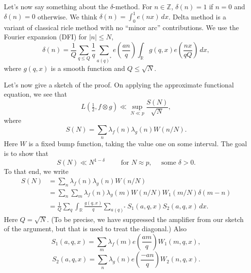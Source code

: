 \documentclass[reqno]{amsart} 
\begin{document}
Let's now say something about the $\delta$-method.  For $n \in \mathbb{Z}$, $\delta(n) = 1$ if $n = 0$ and $\delta(n) = 0$ otherwise.  We think $\delta(n) = \int_0^1 e(n x) \, d x$.  Delta method is a variant of classical ricle method with no ``minor arc'' contributions.  We use the Fourier expansion (DFI) for $\lvert n \rvert \leq N$,
\begin{equation*}
  \delta(n)
  = \frac{1}{Q}
  \sum_{q \leq Q}
  \frac{1}{q}
  \sum_{a(q)^*}
  e \left( \frac{a n}{q} \right)
  \int_{\mathbb{R}}
  g(q, x)
  e \left( \frac{n x}{q Q} \right)
  \, d x,
\end{equation*}
where $g(q, x)$ is a smooth function and $Q \leq \sqrt{N}$.

Let's now give a sketch of the proof.  On applying the approximate functional equation, we see that
\begin{equation*}
  L(\tfrac{1}{2} , f \otimes g) \ll \sup_{N \ll p} \frac{S(N)}{\sqrt{N}},
\end{equation*}
where
\begin{equation*}
  S(N) = \sum_n \lambda_f(n) \lambda_g(n) W(n / N).
\end{equation*}
Here $W$ is a fixed bump function, taking the value one on some interval.  The goal is to show that
\begin{equation*}
  S(N) \ll N^{1 - \delta} \qquad \text{ for } N \approx p, \quad \text{ some } \delta > 0.
\end{equation*}
To that end, we write
\begin{align*}
  S(N) &=
         \sum_n \lambda_f(n) \lambda_g(n) W(n/N)
  \\
       &=
         \sum_n \sum_m \lambda_f(n) \lambda_g(m)
         W(n/N) W_1(m/N)
         \delta(m - n)
  \\
       &=
         \frac{1}{Q}
         \sum_q \int_{\mathbb{R}}
         \frac{g(q, x)}{q}
         \sum_{a(q)^\ast}
         S_1(a, q, x) S_2(a, q, x) \, d x.
\end{align*}
Here $Q = \sqrt{N}$.  (To be precise, we have suppressed the amplifier from our sketch of the argument, but that is used to treat the diagonal.)  Also
\begin{equation*}
  S_1(a, q, x) = \sum_{m} \lambda_f(m) e \left( \frac{a m}{q} \right)
  W_1(m, q, x),
\end{equation*}
\begin{equation*}
  S_2(a, q, x) = \sum_n \lambda_g(n) e \left( \frac{- a n}{q} \right)
  W_2(n, q, x).
\end{equation*}
\end{document}
